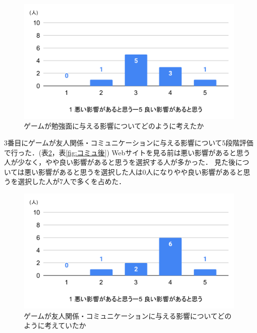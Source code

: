 \documentclass[12pt,a4j,titlepage]{ltjsarticle}
\begin{document}
\begin{figure}[H]
 \begin{center}
  \includegraphics[keepaspectratio, scale=0.5]{勉強後.pdf}
 \end{center}
 \caption{ゲームが勉強面に与える影響についてどのように考えたか}
 \label{fig:勉強後}
\end{figure}

3番目にゲームが友人関係・コミュニケーションに与える影響について5段階評価で行った．(表\ref{fig:コミュ前}，表\ref{fig:コミュ後})
Webサイトを見る前は悪い影響があると思う人が少なく，やや良い影響があると思うを選択する人が多かった．
見た後については悪い影響があると思うを選択した人は0人になりやや良い影響があると思うを選択した人が7人で多くを占めた．

\begin{figure}[H]
 \begin{center}
  \includegraphics[keepaspectratio, scale=0.5]{コミュ前.pdf}
 \end{center}
 \caption{ゲームが友人関係・コミュニケーションに与える影響についてどのように考えていたか}
 \label{fig:コミュ前}
\end{figure}
\end{document}
